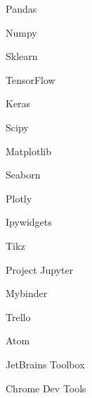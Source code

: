    \begin{cvskills}{4}{0}
                {\faPython}         %
                {                   %
                    \begin{cvitems}
                        \item {Pandas}
                        \item {Numpy}
                        \item {Sklearn}
                        \item {TensorFlow}
                        \item {Keras}
                        \item {Scipy}
                    \end{cvitems}
                }
                {\faLineChart}  %
                {               %
                    \begin{cvitems}
                        \item {Matplotlib}
                        \item {Seaborn}
                        \item {Plotly}
                        \item {Ipywidgets}
                        \item {Tikz}
                    \end{cvitems}
                }
                {\faUsers}      %
                {               %
                    \begin{cvitems}
                        \item {Project Jupyter}
                        \item {Mybinder}
                        \item {Trello}
                    \end{cvitems}
                }
                {\faTools}      %
                {               %
                    \begin{cvitems}
                        \item {Atom}
                        \item {JetBrains Toolbox}
                        \item {Chrome Dev Tools}
                    \end{cvitems}
                }
    \end{cvskills}

